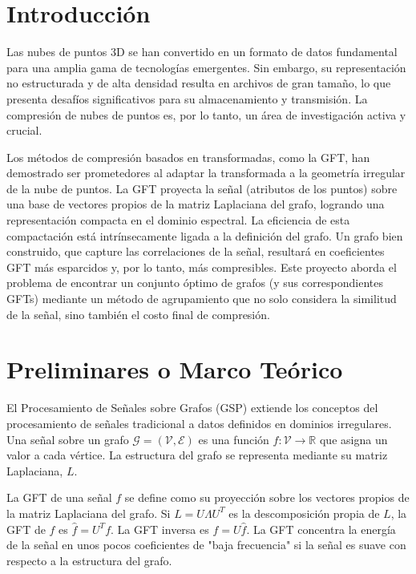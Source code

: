 \section{Introducción}
Las nubes de puntos 3D se han convertido en un formato de datos fundamental para una amplia gama de tecnologías
emergentes. Sin embargo, su representación no estructurada y de alta densidad resulta en archivos de gran tamaño, lo
que presenta desafíos significativos para su almacenamiento y transmisión. La compresión de nubes de puntos es, por lo
tanto, un área de investigación activa y crucial.

Los métodos de compresión basados en transformadas, como la GFT, han demostrado ser prometedores al adaptar la
transformada a la geometría irregular de la nube de puntos\cite{zhang2014point}. La GFT proyecta la señal (atributos de los puntos) sobre una base de vectores propios de la matriz Laplaciana del grafo, logrando una representación compacta en el dominio
espectral. La eficiencia de esta compactación está intrínsecamente ligada a la definición del grafo. Un grafo bien
construido, que capture las correlaciones de la señal, resultará en coeficientes GFT más esparcidos y, por lo tanto,
más compresibles. 
Este proyecto aborda el problema de encontrar un conjunto óptimo de grafos (y sus correspondientes GFTs) mediante un
método de agrupamiento que no solo considera la similitud de la señal, sino también el costo final de compresión.

\section{Preliminares o Marco Teórico}
\begin{definition}
El Procesamiento de Señales sobre Grafos (GSP) extiende los conceptos del procesamiento de señales tradicional a datos
definidos en dominios irregulares. Una señal sobre un grafo $\mathcal{G} = (\mathcal{V}, \mathcal{E})$ es una función
$f: \mathcal{V} \to \mathbb{R}$ que asigna un valor a cada vértice. La estructura del grafo se representa mediante su
matriz Laplaciana, $L$\cite{ortega2022gsp}.
\end{definition}

\begin{definition}
La GFT de una señal $f$ se define como su proyección sobre los vectores propios de la matriz Laplaciana del grafo. Si
$L = U \Lambda U^T$ es la descomposición propia de $L$, la GFT de $f$ es $\hat{f} = U^T f$. La GFT inversa es $f = U
\hat{f}$. La GFT concentra la energía de la señal en unos pocos coeficientes de "baja frecuencia" si la señal es suave
con respecto a la estructura del grafo\cite{ortega2022gsp}.
\end{definition}

